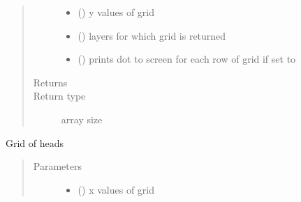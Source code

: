 \documentclass[letterpaper,10pt,english]{sphinxmanual}
\begin{document}
\begin{fulllineitems}
\begin{fulllineitems}
\begin{quote}
\begin{description}
\begin{itemize}
\item {} 
 () \textendash{} y values of grid

\item {} 
 (\sphinxstyleliteralemphasis{, }\sphinxstyleliteralemphasis{, }) \textendash{} layers for which grid is returned

\item {} 
 (\sphinxstyleliteralemphasis{, }) \textendash{} prints dot to screen for each row of grid if set to 

\end{itemize}

\item[{Returns}] \leavevmode
{}

\item[{Return type}] \leavevmode
array size 

\end{description}\end{quote}




{\hyperref[\detokenize{models/model:timml.model.Model.headgrid2}]{}}



\end{fulllineitems}


\begin{fulllineitems}
\label{\detokenize{models/model:timml.model.Model.headgrid2}}
Grid of heads
\begin{quote}\begin{description}
\item[{Parameters}] \leavevmode\begin{itemize}
\item {} 
\sphinxstyleliteralstrong{, } (\sphinxstyleliteralemphasis{,}) \textendash{} x values of grid


\end{itemize}
\end{description}
\end{quote}
\end{fulllineitems}
\end{fulllineitems}
\end{document}
